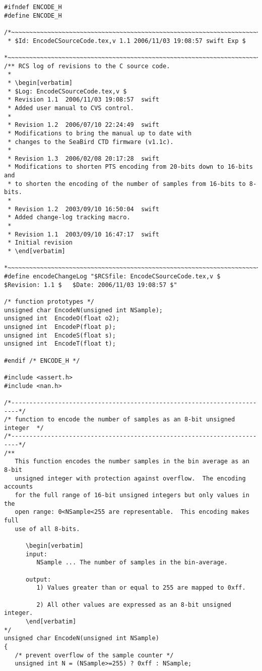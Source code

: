 {\small
\begin{verbatim}
#ifndef ENCODE_H
#define ENCODE_H

/*~~~~~~~~~~~~~~~~~~~~~~~~~~~~~~~~~~~~~~~~~~~~~~~~~~~~~~~~~~~~~~~~~~~~~~~~
 * $Id: EncodeCSourceCode.tex,v 1.1 2006/11/03 19:08:57 swift Exp $
 *~~~~~~~~~~~~~~~~~~~~~~~~~~~~~~~~~~~~~~~~~~~~~~~~~~~~~~~~~~~~~~~~~~~~~~~~*/
/** RCS log of revisions to the C source code.
 *
 * \begin[verbatim]
 * $Log: EncodeCSourceCode.tex,v $
 * Revision 1.1  2006/11/03 19:08:57  swift
 * Added user manual to CVS control.
 *
 * Revision 1.2  2006/07/10 22:24:49  swift
 * Modifications to bring the manual up to date with
 * changes to the SeaBird CTD firmware (v1.1c).
 *
 * Revision 1.3  2006/02/08 20:17:28  swift
 * Modifications to shorten PTS encoding from 20-bits down to 16-bits and
 * to shorten the encoding of the number of samples from 16-bits to 8-bits.
 *
 * Revision 1.2  2003/09/10 16:50:04  swift
 * Added change-log tracking macro.
 *
 * Revision 1.1  2003/09/10 16:47:17  swift
 * Initial revision
 * \end[verbatim]
 *~~~~~~~~~~~~~~~~~~~~~~~~~~~~~~~~~~~~~~~~~~~~~~~~~~~~~~~~~~~~~~~~~~~~~~~~*/
#define encodeChangeLog "$RCSfile: EncodeCSourceCode.tex,v $  $Revision: 1.1 $   $Date: 2006/11/03 19:08:57 $"

/* function prototypes */
unsigned char EncodeN(unsigned int NSample);
unsigned int  EncodeO(float o2);
unsigned int  EncodeP(float p);
unsigned int  EncodeS(float s);
unsigned int  EncodeT(float t);

#endif /* ENCODE_H */

#include <assert.h>
#include <nan.h>

/*------------------------------------------------------------------------*/
/* function to encode the number of samples as an 8-bit unsigned integer  */
/*------------------------------------------------------------------------*/
/**
   This function encodes the number samples in the bin average as an 8-bit
   unsigned integer with protection against overflow.  The encoding accounts
   for the full range of 16-bit unsigned integers but only values in the
   open range: 0<NSample<255 are representable.  This encoding makes full
   use of all 8-bits.

      \begin[verbatim]
      input:
         NSample ... The number of samples in the bin-average.

      output:
         1) Values greater than or equal to 255 are mapped to 0xff.

         2) All other values are expressed as an 8-bit unsigned integer.
      \end[verbatim]
*/
unsigned char EncodeN(unsigned int NSample)
{
   /* prevent overflow of the sample counter */
   unsigned int N = (NSample>=255) ? 0xff : NSample;
   

\end{verbatim}}
